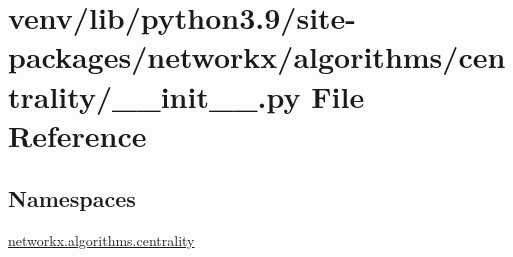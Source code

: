 \hypertarget{venv_2lib_2python3_89_2site-packages_2networkx_2algorithms_2centrality_2____init_____8py}{}\section{venv/lib/python3.9/site-\/packages/networkx/algorithms/centrality/\+\_\+\+\_\+init\+\_\+\+\_\+.py File Reference}
\label{venv_2lib_2python3_89_2site-packages_2networkx_2algorithms_2centrality_2____init_____8py}
\subsection*{Namespaces}
\begin{DoxyCompactItemize}
\item 
 \hyperlink{namespacenetworkx_1_1algorithms_1_1centrality}{networkx.\+algorithms.\+centrality}
\end{DoxyCompactItemize}
